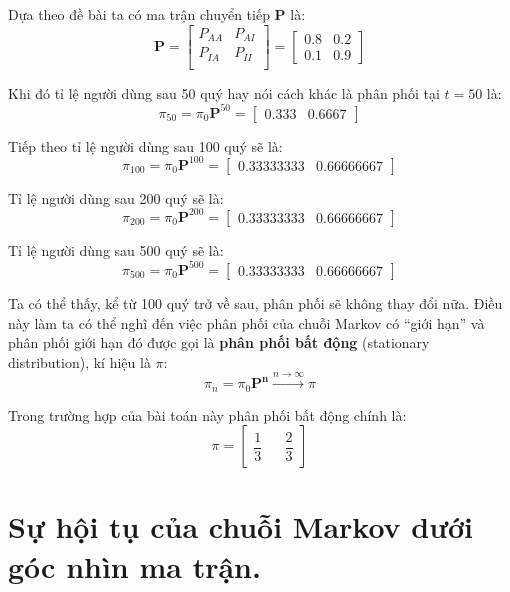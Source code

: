 \noindent Dựa theo đề bài ta có ma trận chuyển tiếp $\mathbf{P}$ là:
$$
\mathbf{P} = \begin{bmatrix}
    P_{AA} & P_{AI} \\
    P_{IA} & P_{II} \\
\end{bmatrix} = \begin{bmatrix}
    0.8 & 0.2 \\
    0.1 & 0.9 
\end{bmatrix}
$$

\noindent Khi đó tỉ lệ người dùng sau 50 quý hay nói cách khác là phân phối tại $t = 50$ là:
$$
\pi_{50} = \pi_0 \mathbf{P}^{50} = 
\begin{bmatrix}
    0.333 & 0.6667
\end{bmatrix}
$$

\noindent Tiếp theo tỉ lệ người dùng sau 100 quý sẽ là:
$$
\pi_{100} = \pi_0 \mathbf{P}^{100} = \begin{bmatrix}
   0.33333333 & 0.66666667 
\end{bmatrix}
$$

\noindent Tỉ lệ người dùng sau 200 quý sẽ là:
$$
\pi_{200} = \pi_0 \mathbf{P}^{200} = \begin{bmatrix}
    0.33333333 & 0.66666667
\end{bmatrix}
$$

\noindent Tỉ lệ người dùng sau 500 quý sẽ là:
$$
\pi_{500} = \pi_0 \mathbf{P}^{500} = \begin{bmatrix}
    0.33333333 & 0.66666667
\end{bmatrix}
$$

\noindent Ta có thể thấy, kể từ 100 quý trở về sau, phân phối sẽ không thay đổi nữa. Điều này làm ta có thể nghĩ đến việc phân phối của chuỗi Markov có ``giới hạn'' và phân phối giới hạn đó được gọi là \textbf{phân phối bất động} (stationary distribution), kí hiệu là $\pi$:
$$
\pi_n = \pi_0 \mathbf{P^n} \xrightarrow{n \to \infty} \pi
$$

\noindent Trong trường hợp của bài toán này phân phối bất động chính là:
$$
\pi = \begin{bmatrix}
    \dfrac{1}{3} && \dfrac{2}{3}
\end{bmatrix}
$$
\pagebreak

\section{Sự hội tụ của chuỗi Markov dưới góc nhìn ma trận.}


